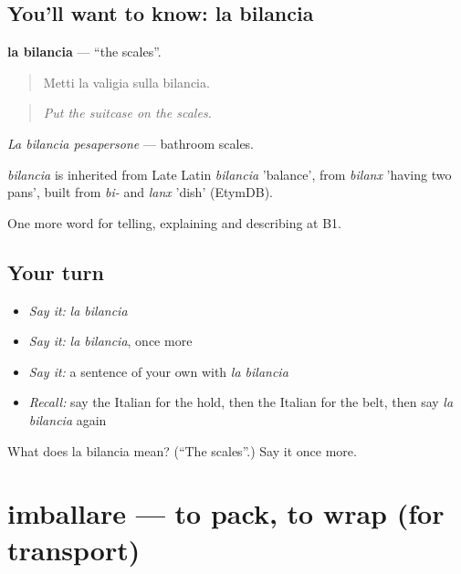 \subsection*{You'll want to know: la bilancia}
\textbf{la bilancia} — \textquotedblleft{}the scales\textquotedblright{}.

\begin{quote}
Metti la valigia sulla bilancia.
\end{quote}

\begin{quote}
\emph{Put the suitcase on the scales.}
\end{quote}

\emph{La bilancia pesapersone} — bathroom scales.

\begin{cousinweb}
\emph{bilancia} is inherited from Late Latin \emph{bilancia} 'balance', from \emph{bilanx} 'having two pans', built from \emph{bi-} and \emph{lanx} 'dish' (EtymDB).
\end{cousinweb}

\begin{grammarlens}[title={What you've built}]
One more word for telling, explaining and describing at B1.
\end{grammarlens}

\subsection*{Your turn}
\begin{itemize}
\raggedright
  \item \emph{Say it:} \emph{la bilancia}
  \item \emph{Say it:} \emph{la bilancia}, once more
  \item \emph{Say it:} a sentence of your own with \emph{la bilancia}
  \item \emph{Recall:} say the Italian for the hold, then the Italian for the belt, then say \emph{la bilancia} again
\end{itemize}

\begin{tcolorbox}[breakable,colback=teal!4,colframe=teal!35!black,title={Before you move on}]
What does la bilancia mean? (\textquotedblleft{}The scales\textquotedblright{}.) Say it once more.
\end{tcolorbox}
\section[imballare]{imballare — to pack, to wrap (for transport)}

